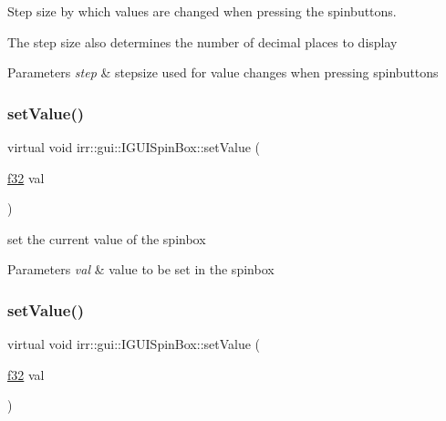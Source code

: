 Step size by which values are changed when pressing the spinbuttons. 

The step size also determines the number of decimal places to display 
\begin{DoxyParams}{Parameters}
{\em step} & stepsize used for value changes when pressing spinbuttons \\
\hline
\end{DoxyParams}
\mbox{\label{classirr_1_1gui_1_1IGUISpinBox_a28e388e3767d4257f712d899c744bc20}} 
\subsubsection{\texorpdfstring{set\+Value()}{setValue()}\hspace{0.1cm}{\footnotesize\ttfamily [1/2]}}
{\footnotesize\ttfamily virtual void irr\+::gui\+::\+I\+G\+U\+I\+Spin\+Box\+::set\+Value (\begin{DoxyParamCaption}\item[{\hyperlink{namespaceirr_a0277be98d67dc26ff93b1a6a1d086b07}{f32}}]{val }\end{DoxyParamCaption})\hspace{0.3cm}{\ttfamily [pure virtual]}}



set the current value of the spinbox 


\begin{DoxyParams}{Parameters}
{\em val} & value to be set in the spinbox \\
\hline
\end{DoxyParams}
\mbox{\label{classirr_1_1gui_1_1IGUISpinBox_a28e388e3767d4257f712d899c744bc20}} 
\subsubsection{\texorpdfstring{set\+Value()}{setValue()}\hspace{0.1cm}{\footnotesize\ttfamily [2/2]}}
{\footnotesize\ttfamily virtual void irr\+::gui\+::\+I\+G\+U\+I\+Spin\+Box\+::set\+Value (\begin{DoxyParamCaption}\item[{\hyperlink{namespaceirr_a0277be98d67dc26ff93b1a6a1d086b07}{f32}}]{val }\end{DoxyParamCaption})\hspace{0.3cm}{\ttfamily [pure virtual]}}



